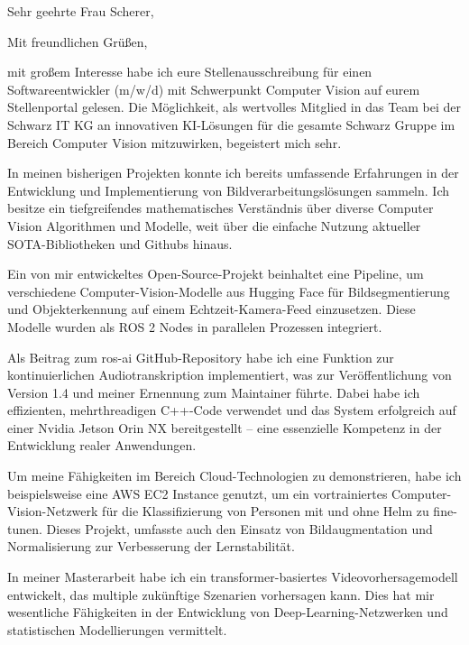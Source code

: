 \documentclass[11pt,a4paper,skipsamekey]{moderncv}
\begin{document}
	\date{\today}
	\opening{Sehr geehrte Frau Scherer,}
	\closing{Mit freundlichen Grüßen,}
	\makelettertitle

mit großem Interesse habe ich eure Stellenausschreibung für einen Softwareentwickler (m/w/d) mit Schwerpunkt Computer Vision auf eurem Stellenportal gelesen. Die Möglichkeit, als wertvolles Mitglied in das Team bei der Schwarz IT KG an innovativen KI-Lösungen für die gesamte Schwarz Gruppe im Bereich Computer Vision mitzuwirken, begeistert mich sehr.
		
In meinen bisherigen Projekten konnte ich bereits umfassende Erfahrungen in der Entwicklung und Implementierung von Bildverarbeitungslösungen sammeln. Ich besitze ein tiefgreifendes mathematisches Verständnis über diverse Computer Vision Algorithmen und Modelle, weit über die einfache Nutzung aktueller SOTA-Bibliotheken und Githubs hinaus.
 
Ein von mir entwickeltes Open-Source-Projekt beinhaltet eine Pipeline, um verschiedene Computer-Vision-Modelle aus Hugging Face für Bildsegmentierung und Objekterkennung auf einem Echtzeit-Kamera-Feed einzusetzen. Diese Modelle wurden als ROS 2 Nodes in parallelen Prozessen integriert.
 
Als Beitrag zum ros-ai GitHub-Repository habe ich eine Funktion zur kontinuierlichen Audiotranskription implementiert, was zur Veröffentlichung von Version 1.4 und meiner Ernennung zum Maintainer führte. Dabei habe ich effizienten, mehrthreadigen C++-Code verwendet und das System erfolgreich auf einer Nvidia Jetson Orin NX bereitgestellt – eine essenzielle Kompetenz in der Entwicklung realer Anwendungen.
 
Um meine Fähigkeiten im Bereich Cloud-Technologien zu demonstrieren, habe ich beispielsweise eine AWS EC2 Instance genutzt, um ein vortrainiertes Computer-Vision-Netzwerk für die Klassifizierung von Personen mit und ohne Helm zu fine-tunen. Dieses Projekt, umfasste auch den Einsatz von Bildaugmentation und Normalisierung zur Verbesserung der Lernstabilität. 

In meiner Masterarbeit habe ich ein transformer-basiertes Videovorhersagemodell entwickelt, das multiple zukünftige Szenarien vorhersagen kann. Dies hat mir wesentliche Fähigkeiten in der Entwicklung von Deep-Learning-Netzwerken und statistischen Modellierungen vermittelt.
   
\end{document}
